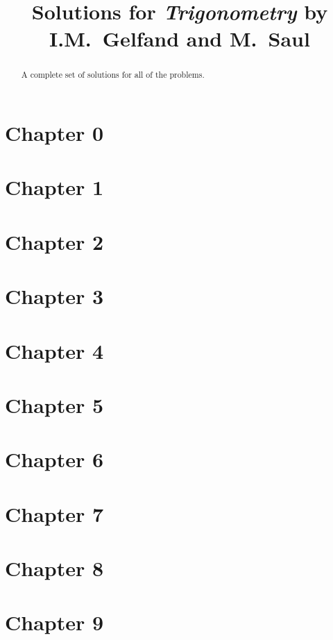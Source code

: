 \documentclass{article}
\title{Solutions for \textit{Trigonometry} by I.M.~Gelfand and M.~Saul}
\author{}
\begin{document}
\maketitle

\begin{abstract}
A complete set of solutions for all of the problems.
\end{abstract}

\section*{Chapter 0}


\section*{Chapter 1}


\section*{Chapter 2}


\section*{Chapter 3}


\section*{Chapter 4}


\section*{Chapter 5}


\section*{Chapter 6}


\section*{Chapter 7}


\section*{Chapter 8}


\section*{Chapter 9}
\end{document}
